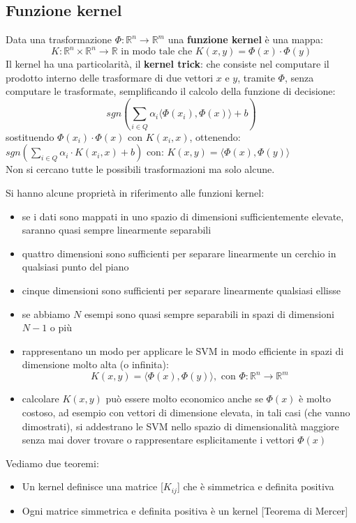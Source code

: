 \subsection{Funzione kernel}
Data una trasformazione $\Phi:\mathbb{R}^n\to \mathbb{R}^m$ una \textbf{funzione kernel} è una mappa: \\
$$K:\mathbb{R}^n\times \mathbb{R}^n\to \mathbb{R}\mbox{ in modo tale che }K(x,y)=\Phi(x)\cdot \Phi(y)$$
Il kernel ha una particolarità, il \textbf{kernel trick}: che consiste nel computare il prodotto interno delle trasformare di due vettori $x$ e $y$, tramite $\Phi$, senza computare le trasformate, semplificando il calcolo della funzione di decisione:$$sgn\left(\displaystyle \sum_{i\in Q}\alpha_i\langle \Phi(x_i) , \Phi(x) \rangle + b \right)$$ sostituendo $\Phi(x_i)\cdot\Phi(x)$ con $K(x_i,x)$, ottenendo: $sgn\left(\sum_{i\in Q}\alpha_i\cdot K(x_i,x)+b\right)$  con: $K(x,y)=\langle \Phi(x) , \Phi(y) \rangle$\\
Non si cercano tutte le possibili trasformazioni ma solo alcune.


Si hanno alcune proprietà in riferimento alle funzioni kernel:
\begin{itemize}
  \item se i dati sono mappati in uno spazio di dimensioni sufficientemente elevate, saranno quasi sempre linearmente separabili
  \item quattro dimensioni sono sufficienti per separare linearmente un cerchio in qualsiasi punto del piano
  \item cinque dimensioni sono sufficienti per separare linearmente qualsiasi ellisse
  \item se abbiamo $N$ esempi sono quasi sempre separabili in spazi di dimensioni $N-1$ o più
  \item rappresentano un modo per applicare le SVM in modo efficiente in spazi di dimensione molto alta (o infinita): $$
    K(x,y) = \langle \Phi(x) , \Phi(y) \rangle, \mbox{ con } \Phi: \mathbb{R}^n \to \mathbb{R}^m
  $$
  \item calcolare $K(x,y)$ può essere molto economico anche se $\Phi(x)$ è molto costoso, ad esempio con vettori di dimensione elevata, in tali casi (che vanno dimostrati), si addestrano le SVM nello spazio di dimensionalità maggiore senza mai dover trovare o rappresentare esplicitamente i vettori $\Phi(x)$
\end{itemize}

Vediamo due teoremi:
\begin{itemize}
    \item Un kernel definisce una matrice [$K_{ij}$] che è simmetrica e definita positiva
    \item Ogni matrice simmetrica e definita positiva è un kernel [Teorema di Mercer]
\end{itemize}
